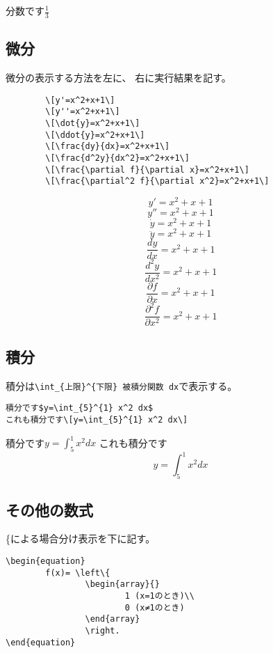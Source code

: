 \documentclass{jsarticle}
\begin{document}
分数です$\frac{1}{3}$\\

\subsection{微分}
微分の表示する方法を左に、
右に実行結果を記す。

\begin{minipage}{0.5\hsize}
		\begin{verbatim}
		\[y'=x^2+x+1\]
		\[y''=x^2+x+1\]
		\[\dot{y}=x^2+x+1\]
		\[\ddot{y}=x^2+x+1\]
		\[\frac{dy}{dx}=x^2+x+1\]
		\[\frac{d^2y}{dx^2}=x^2+x+1\]
		\[\frac{\partial f}{\partial x}=x^2+x+1\]
		\[\frac{\partial^2 f}{\partial x^2}=x^2+x+1\]
		\end{verbatim}
\end{minipage}
\begin{minipage}{0.5\hsize}
		\[y'=x^2+x+1\]
		\[y''=x^2+x+1\]
		\[\dot{y}=x^2+x+1\]
		\[\ddot{y}=x^2+x+1\]
		\[\frac{dy}{dx}=x^2+x+1\]
		\[\frac{d^2y}{dx^2}=x^2+x+1\]
		\[\frac{\partial f}{\partial x}=x^2+x+1\]
		\[\frac{\partial^2 f}{\partial x^2}=x^2+x+1\]
\end{minipage}

\subsection{積分}
積分は\verb|\int_{上限}^{下限} 被積分関数 dx|で表示する。

\begin{verbatim}
積分です$y=\int_{5}^{1} x^2 dx$ 
これも積分です\[y=\int_{5}^{1} x^2 dx\]
\end{verbatim}

積分です$y=\int_{5}^{1} x^2 dx$ 
これも積分です\[y=\int_{5}^{1} x^2 dx\]

\subsection{その他の数式}
\{による場合分け表示を下に記す。

\begin{verbatim}
\begin{equation}
		f(x)= \left\{
				\begin{array}{}
						1 (x=1のとき)\\
						0 (x≠1のとき)
				\end{array}
				\right.
\end{equation}
\end{verbatim}
\end{document}

